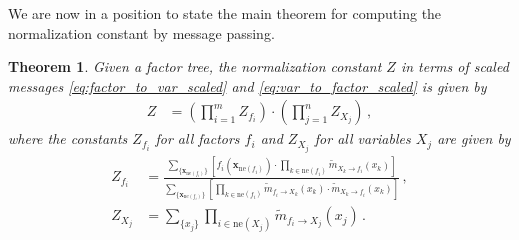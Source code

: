 \documentclass[a4paper]{article}
\newcommand{\bs}[1]{\boldsymbol{#1}}
\newcommand{\neighbours}[1]{{\mathrm{ne} \left( {#1} \right)}}
\newtheorem{theorem}{Theorem}
\theoremstyle{definition}
\begin{document}
We are now in a position to state the main theorem for computing the normalization constant by message passing.
\begin{theorem}
    Given a factor tree, the normalization constant $Z$ in terms of scaled messages \eqref{eq:factor_to_var_scaled} and \eqref{eq:var_to_factor_scaled} is given by
    \begin{align}
        Z & = \left( \prod_{i=1}^m Z_{f_i} \right) \cdot \left( \prod_{j=1}^n Z_{X_j} \right)\,, \label{eq:partition_message} 
    \end{align}
    where the constants $Z_{f_i}$ for all factors $f_i$ and $Z_{X_j}$ for all variables $X_j$ are given by
    \begin{align}
        Z_{f_i} & = \frac{\sum_{\{\bs{x}_{\neighbours{f_i}}\}} \left[ f_i(\bs{x}_{\neighbours{f_i}}) \cdot \prod_{k \in \neighbours{f_i}} \widetilde{m}_{X_k \to f_i}(x_k) \right]}{\sum_{\{\bs{x}_{\neighbours{f_i}}\}} \left[ \prod_{k \in \neighbours{f_i}} \widetilde{m}_{f_i \to X_k}(x_k) \cdot \widetilde{m}_{X_k \to f_i}(x_k) \right]} \,, \label{eq:partition_factor_message} \\
        Z_{X_j} & = \sum_{\{ x_j \}} \prod_{i \in \neighbours{X_j}} \widetilde{m}_{f_i \to X_j}(x_j) \,. \label{eq:partition_marginal_message}
    \end{align}
\end{theorem}
\end{document}
